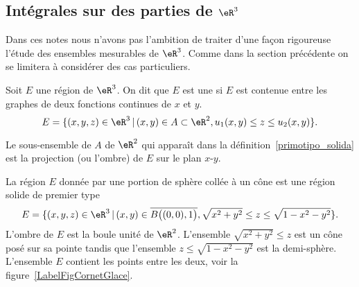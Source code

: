 \subsection{Intégrales sur des parties de \( \eR^3\)}
Dans ces notes nous n'avons pas l'ambition de traiter d'une façon rigoureuse l'étude des ensembles mesurables de \( \eR^3\). Comme dans la section précédente on se limitera à considérer des cas particuliers.
\begin{definition}\label{primotipo_solida}
	Soit \( E\) une région de  \( \eR^3\). On dit que \( E\) est une  si \( E\) est contenue entre les graphes de deux fonctions continues de \( x\) et \( y\).
	\[
		E=\{(x,y,z)\in\eR^3\, \vert \, (x,y)\in A\subset \eR^2, u_1(x,y)\leq z\leq u_2(x,y) \}.
	\]
\end{definition}
Le sous-ensemble de \( A\)  de \( \eR^2\) qui apparaît dans la définition~\ref{primotipo_solida} est la projection (ou l'ombre) de \( E\) sur le plan \( x\)-\( y\).

\begin{example}\label{cornet}
	La région \( E\) donnée par une portion de sphère collée à un cône est une région solide de premier type
	\begin{equation}
		E=\{(x,y,z)\in\eR^3\, \vert \, (x,y)\in \overline{  B\big((0,0),1\big)}, \sqrt{x^2+y^2}\leq z\leq \sqrt{1-x^2-y^2} \}.
	\end{equation}
	L'ombre de \( E\) est la boule unité de \( \eR^2\). L'ensemble \( \sqrt{x^2+y^2}\leq z\) est un cône posé sur sa pointe tandis que l'ensemble \( z\leq\sqrt{ 1-x^2-y^2 }\) est la demi-sphère. L'ensemble \( E\) contient les points entre les deux, voir la figure~\ref{LabelFigCornetGlace}.
	\newcommand{\CaptionFigCornetGlace}{Il faut voir ça en trois dimensions.}
	

\end{example}

